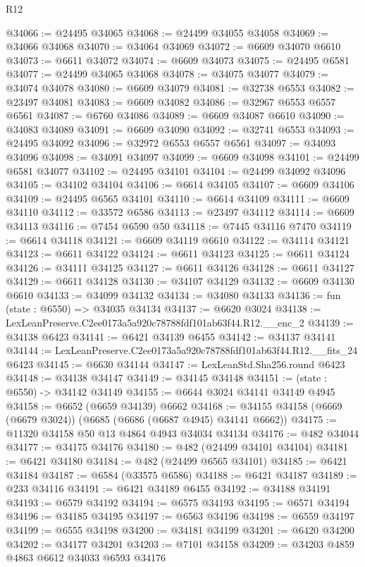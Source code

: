 \begin{lexlean}{R12}
\begin{coremodule}
@34066 := @24495 @34065
@34068 := @24499 @34055 @34058
@34069 := @34066 @34068
@34070 := @34064 @34069
@34072 := @6609 @34070 @6610
@34073 := @6611 @34072
@34074 := @6609 @34073
@34075 := @24495 @6581
@34077 := @24499 @34065 @34068
@34078 := @34075 @34077
@34079 := @34074 @34078
@34080 := @6609 @34079
@34081 := @32738 @6553
@34082 := @23497 @34081
@34083 := @6609 @34082
@34086 := @32967 @6553 @6557 @6561
@34087 := @6760 @34086
@34089 := @6609 @34087 @6610
@34090 := @34083 @34089
@34091 := @6609 @34090
@34092 := @32741 @6553
@34093 := @24495 @34092
@34096 := @32972 @6553 @6557 @6561
@34097 := @34093 @34096
@34098 := @34091 @34097
@34099 := @6609 @34098
@34101 := @24499 @6581 @34077
@34102 := @24495 @34101
@34104 := @24499 @34092 @34096
@34105 := @34102 @34104
@34106 := @6614 @34105
@34107 := @6609 @34106
@34109 := @24495 @6565 @34101
@34110 := @6614 @34109
@34111 := @6609 @34110
@34112 := @33572 @6586
@34113 := @23497 @34112
@34114 := @6609 @34113
@34116 := @7454 @6590 @50
@34118 := @7445 @34116 @7470
@34119 := @6614 @34118
@34121 := @6609 @34119 @6610
@34122 := @34114 @34121
@34123 := @6611 @34122
@34124 := @6611 @34123
@34125 := @6611 @34124
@34126 := @34111 @34125
@34127 := @6611 @34126
@34128 := @6611 @34127
@34129 := @6611 @34128
@34130 := @34107 @34129
@34132 := @6609 @34130 @6610
@34133 := @34099 @34132
@34134 := @34080 @34133
@34136 := fun (state : @6550) => @34035 @34134
@34137 := @6620 @3024
@34138 := LexLeanPreserve.C2ee0173a5a920c78788fdf101ab63f44.R12.__enc_2
@34139 := @34138 @6423
@34141 := @6421 @34139 @6455
@34142 := @34137 @34141
@34144 := LexLeanPreserve.C2ee0173a5a920c78788fdf101ab63f44.R12.__fits_24 @6423
@34145 := @6630 @34144
@34147 := LexLeanStd.Sha256.round @6423
@34148 := @34138 @34147
@34149 := @34145 @34148
@34151 := (state : @6550) -> @34142 @34149
@34155 := @6644 @3024 @34141 @34149 @4945
@34158 := @6652 (@6659 @34139) @6662
@34168 := @34155 @34158 (@6669 (@6679 @3024)) (@6685 (@6686 (@6687 @4945) @34141 @6662))
@34175 := @11320 @34158 @50 @13 @4864 @4943 @34034 @34134
@34176 := @482 @34044
@34177 := @34175 @34176
@34180 := @482 (@24499 @34101 @34104)
@34181 := @6421 @34180
@34184 := @482 (@24499 @6565 @34101)
@34185 := @6421 @34184
@34187 := @6584 (@33575 @6586)
@34188 := @6421 @34187
@34189 := @233 @34116
@34191 := @6421 @34189 @6455
@34192 := @34188 @34191
@34193 := @6579 @34192
@34194 := @6575 @34193
@34195 := @6571 @34194
@34196 := @34185 @34195
@34197 := @6563 @34196
@34198 := @6559 @34197
@34199 := @6555 @34198
@34200 := @34181 @34199
@34201 := @6420 @34200
@34202 := @34177 @34201
@34203 := @7101 @34158
@34209 := @34203 @4859 @4863 @6612 @34033 @6593 @34176

\end{coremodule}
\end{lexlean}
